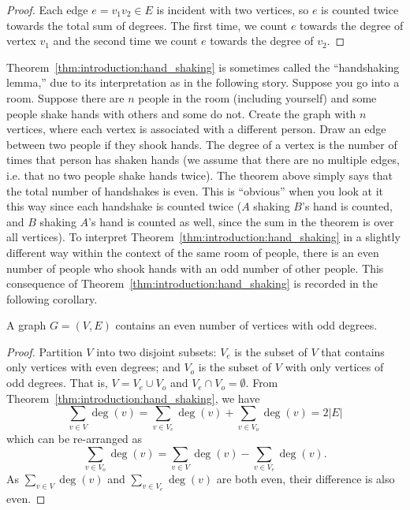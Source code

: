 \begin{proof}
Each edge $e = v_1 v_2 \in E$ is incident with two vertices, so $e$ is
counted twice towards the total sum of degrees. The first time, we
count $e$ towards the degree of vertex $v_1$ and the second time we
count $e$ towards the degree of $v_2$.
\end{proof}

Theorem~\ref{thm:introduction:hand_shaking} is sometimes called the
``handshaking lemma,'' due to its interpretation as in the following
story. Suppose you go into a room. Suppose there are $n$ people in the
room (including yourself) and some people shake hands with others and
some do not. Create the graph with $n$ vertices, where each vertex is
associated with a different person. Draw an edge between two people if
they shook hands. The degree of a vertex is the number of times that
person has shaken hands (we assume that there are no multiple edges,
i.e. that no two people shake hands twice). The theorem above simply
says that the total number of handshakes is even. This is ``obvious''
when you look at it this way since each handshake is counted twice
($A$ shaking $B$'s hand is counted, and $B$ shaking $A$'s hand is
counted as well, since the sum in the theorem is over all
vertices). To interpret Theorem~\ref{thm:introduction:hand_shaking} in
a slightly different way within the context of the same room of
people, there is an even number of people who shook hands with an odd
number of other people. This consequence of
Theorem~\ref{thm:introduction:hand_shaking} is recorded in the
following corollary.

\begin{corollary}
\label{cor:introduction:even_num_vertices_odd_degree}
A graph $G = (V, E)$ contains an even number of vertices with odd
degrees.
\end{corollary}

\begin{proof}
Partition $V$ into two disjoint subsets: $V_e$ is the subset of $V$
that contains only vertices with even degrees; and $V_o$ is the subset
of $V$ with only vertices of odd degrees. That is, $V = V_e \cup V_o$
and $V_e \cap V_o = \emptyset$. From
Theorem~\ref{thm:introduction:hand_shaking}, we have
\[
\sum_{v \in V} \deg(v)
=
\sum_{v \in V_e} \deg(v) + \sum_{v \in V_o} \deg(v)
=
2 |E|
\]
which can be re-arranged as
\[
\sum_{v \in V_o} \deg(v)
=
\sum_{v \in V} \deg(v) - \sum_{v \in V_e} \deg(v).
\]
As $\sum_{v \in V} \deg(v)$ and $\sum_{v \in V_e} \deg(v)$ are both
even, their difference is also even.
\end{proof}

